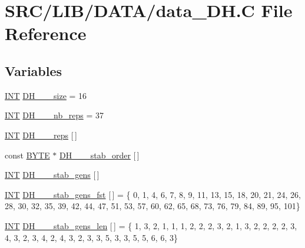 \hypertarget{data___d_h_8_c}{}\section{S\+R\+C/\+L\+I\+B/\+D\+A\+T\+A/data\+\_\+\+DH.C File Reference}
\label{data___d_h_8_c}
\subsection*{Variables}
\begin{DoxyCompactItemize}
\item 
\mbox{\hyperlink{galois_8h_a09fddde158a3a20bd2dcadb609de11dc}{I\+NT}} \mbox{\hyperlink{data___d_h_8_c_a2353d7101af0dabaf6afd859877871b3}{D\+H\+\_\+\_\+\_\+size}} = 16
\item 
\mbox{\hyperlink{galois_8h_a09fddde158a3a20bd2dcadb609de11dc}{I\+NT}} \mbox{\hyperlink{data___d_h_8_c_ae24699bd810c98de673a5ada88c4ab2c}{D\+H\+\_\+\_\+\_\+nb\+\_\+reps}} = 37
\item 
\mbox{\hyperlink{galois_8h_a09fddde158a3a20bd2dcadb609de11dc}{I\+NT}} \mbox{\hyperlink{data___d_h_8_c_ae0a9bafcc65ab4f0ae801b56178201b6}{D\+H\+\_\+\_\+\_\+reps}} \mbox{[}$\,$\mbox{]}
\item 
const \mbox{\hyperlink{galois_8h_ab6cc7b4aeb6ea31aba2b3fbfc83ff5e6}{B\+Y\+TE}} $\ast$ \mbox{\hyperlink{data___d_h_8_c_aff0d47a8539bfb7bb3a0046b2aaef862}{D\+H\+\_\+\_\+\_\+stab\+\_\+order}} \mbox{[}$\,$\mbox{]}
\item 
\mbox{\hyperlink{galois_8h_a09fddde158a3a20bd2dcadb609de11dc}{I\+NT}} \mbox{\hyperlink{data___d_h_8_c_a0b89a7c65ce2bddae60505a5e7659c63}{D\+H\+\_\+\_\+\_\+stab\+\_\+gens}} \mbox{[}$\,$\mbox{]}
\item 
\mbox{\hyperlink{galois_8h_a09fddde158a3a20bd2dcadb609de11dc}{I\+NT}} \mbox{\hyperlink{data___d_h_8_c_a5265de8be8c4fd76ee57cf80e81f77a6}{D\+H\+\_\+\_\+\_\+stab\+\_\+gens\+\_\+fst}} \mbox{[}$\,$\mbox{]} = \{ 0, 1, 4, 6, 7, 8, 9, 11, 13, 15, 18, 20, 21, 24, 26, 28, 30, 32, 35, 39, 42, 44, 47, 51, 53, 57, 60, 62, 65, 68, 73, 76, 79, 84, 89, 95, 101\}
\item 
\mbox{\hyperlink{galois_8h_a09fddde158a3a20bd2dcadb609de11dc}{I\+NT}} \mbox{\hyperlink{data___d_h_8_c_a00b48aca87db98b9053b858e301c7b02}{D\+H\+\_\+\_\+\_\+stab\+\_\+gens\+\_\+len}} \mbox{[}$\,$\mbox{]} = \{ 1, 3, 2, 1, 1, 1, 2, 2, 2, 3, 2, 1, 3, 2, 2, 2, 2, 3, 4, 3, 2, 3, 4, 2, 4, 3, 2, 3, 3, 5, 3, 3, 5, 5, 6, 6, 3\}

\end{DoxyCompactItemize}

